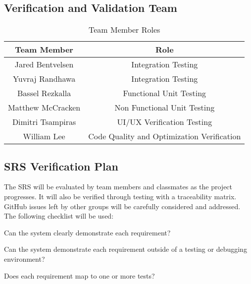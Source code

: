 \documentclass[12pt, titlepage]{article}
\begin{document}
	\subsection{Verification and Validation Team}


	\begin{table}
		\begin{center}
			\begin{tabular}{ |c|c| } 
				\hline
				\textbf{Team Member} & \textbf{Role} \\
				\hline
				Jared Bentvelsen & Integration Testing \\
				\hline 
				Yuvraj Randhawa & Integration Testing \\
				\hline
				Bassel Rezkalla & Functional Unit Testing \\
				\hline
				Matthew McCracken & Non Functional Unit Testing \\
				\hline
				Dimitri Tsampiras & UI/UX Verification Testing \\
				\hline 
				William Lee & Code Quality and Optimization Verification\\
				\hline
			\end{tabular}
			\caption{Team Member Roles}
		\end{center}
	\end{table}
	
	\subsection{SRS Verification Plan}

	The SRS will be evaluated by team members and classmates as the project progresses. It will also be verified through testing with a traceability matrix.
	GitHub issues left by other groups will be carefully considered and addressed.
	The following checklist will be used:
	\begin{todolist}
		\item Can the system clearly demonstrate each requirement?
		\item Can the system demonstrate each requirement outside of a testing or debugging environment?
		\item Does each requirement map to one or more tests?
	\end{todolist}
	
\end{document}
